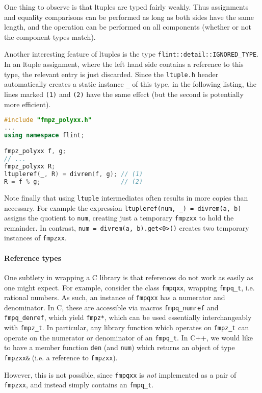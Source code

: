 \documentclass[a4paper,10pt]{book}
\newcommand{\code}{\lstinline}
\begin{document}
{{One thing to observe is that ltuples are typed fairly weakly. Thus assignments
and equality comparisons can be performed as long as both sides have the same
length, and the operation can be performed on all components (whether or not the
component types match).

Another interesting feature of ltuples is the type
\code{flint::detail::IGNORED_TYPE}.
In an ltuple assignment, where the left hand side contains a reference to this
type, the relevant entry is just discarded. Since the \code{ltuple.h} header
automatically creates a static instance \code{_} of this type,
in the following listing, the
lines marked \code{(1)} and \code{(2)} have the same effect (but the second is
potentially more efficient).

\begin{lstlisting}[language=c++]
#include "fmpz_polyxx.h"
...
using namespace flint;

fmpz_polyxx f, g;
// ...
fmpz_polyxx R;
ltupleref(_, R) = divrem(f, g); // (1)
R = f % g;                      // (2)
\end{lstlisting}

Note finally that using \code{ltuple} intermediates often results in more copies
than necessary. For example the expression
\code{ltupleref(num, _) = divrem(a, b)} assigns the quotient to \code{num},
creating just a temporary \code{fmpzxx} to hold the remainder. In contrast,
\code{num = divrem(a, b).get<0>()} creates two temporary instances of
\code{fmpzxx}.

\paragraph{Reference types}

One subtlety in wrapping a C library is that references do not work as easily as
one might expect. For example, consider the class \code{fmpqxx}, wrapping
\code{fmpq_t}, i.e. rational numbers. As such, an instance of \code{fmpqxx} has a
numerator and denominator. In C, these are accessible via macros
\code{fmpq_numref} and \code{fmpq_denref}, which yield \code{fmpz*}, which can
be used essentially interchangeably with \code{fmpz_t}. In particular, any
library function which operates on \code{fmpz_t} can operate on the numerator or
denominator of an \code{fmpq_t}. In C++, we would like to have a member function
\code{den} (and \code{num}) which returns an object of type \code{fmpzxx&} (i.e.
a reference to \code{fmpzxx}).

However, this is not possible, since \code{fmpqxx} is \emph{not} implemented as
a pair of \code{fmpzxx}, and instead simply contains an \code{fmpq_t}.

}}
\end{document}
